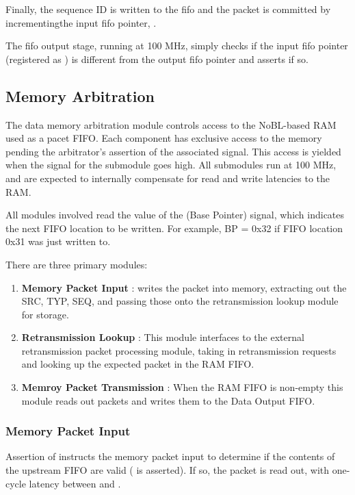 Finally, the sequence ID is written to the fifo and the packet is
committed by incrementingthe input fifo pointer, .

The fifo output stage, running at 100 MHz, simply checks if the input
fifo pointer (registered as ) is different from the
output fifo pointer and asserts  if so.

\subsection{Memory Arbitration}
The data memory arbitration module controls access to the NoBL-based
RAM used as a pacet FIFO. Each component has exclusive access to the
memory pending the arbitrator's assertion of the associated
 signal. This access is yielded when the 
signal for the submodule goes high. All submodules run at 100 MHz, and
are expected to internally compensate for read and write latencies to
the RAM.

All modules involved read the value of the  (Base
Pointer) signal, which indicates the next FIFO location to be written.
For example, BP = 0x32 if FIFO location 0x31 was just written to.

There are three primary modules: 
\begin{enumerate}
\item \textbf{Memory Packet Input} : writes the packet into memory,
  extracting out the SRC, TYP, SEQ, and passing those onto the
  retransmission lookup module for storage.
\item \textbf{Retransmission Lookup} : This module interfaces to the
  external retransmission packet processing module, taking in
  retransmission requests and looking up the expected packet in the
  RAM FIFO.
\item \textbf{Memroy Packet Transmission} : When the RAM FIFO is
  non-empty this module reads out packets and writes them to the Data
  Output FIFO.
\end{enumerate}

\subsubsection{Memory Packet Input}
Assertion of  instructs the memory packet input to
determine if the contents of the upstream FIFO are valid
( is asserted). If so, the packet is read out, with
one-cycle latency between  and
.

